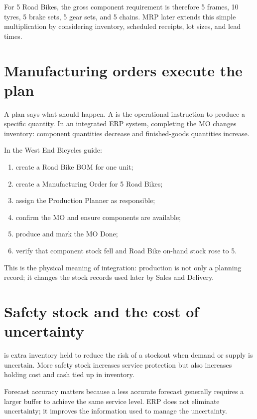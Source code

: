For 5 Road Bikes, the gross component requirement is therefore 5 frames, 10 tyres, 5 brake sets, 5 gear sets, and 5 chains. MRP later extends this simple multiplication by considering inventory, scheduled receipts, lot sizes, and lead times.

\section{Manufacturing orders execute the plan}

A plan says what should happen. A  is the operational instruction to produce a specific quantity. In an integrated ERP system, completing the MO changes inventory: component quantities decrease and finished-goods quantities increase.

\begin{odoobox}
In the West End Bicycles guide:
\begin{enumerate}
  \item create a Road Bike BOM for one unit;
  \item create a Manufacturing Order for 5 Road Bikes;
  \item assign the Production Planner as responsible;
  \item confirm the MO and ensure components are available;
  \item produce and mark the MO Done;
  \item verify that component stock fell and Road Bike on-hand stock rose to 5.
\end{enumerate}
This is the physical meaning of integration: production is not only a planning record; it changes the stock records used later by Sales and Delivery.
\end{odoobox}

\section{Safety stock and the cost of uncertainty}

 is extra inventory held to reduce the risk of a stockout when demand or supply is uncertain. More safety stock increases service protection but also increases holding cost and cash tied up in inventory.

Forecast accuracy matters because a less accurate forecast generally requires a larger buffer to achieve the same service level. ERP does not eliminate uncertainty; it improves the information used to manage the uncertainty.

